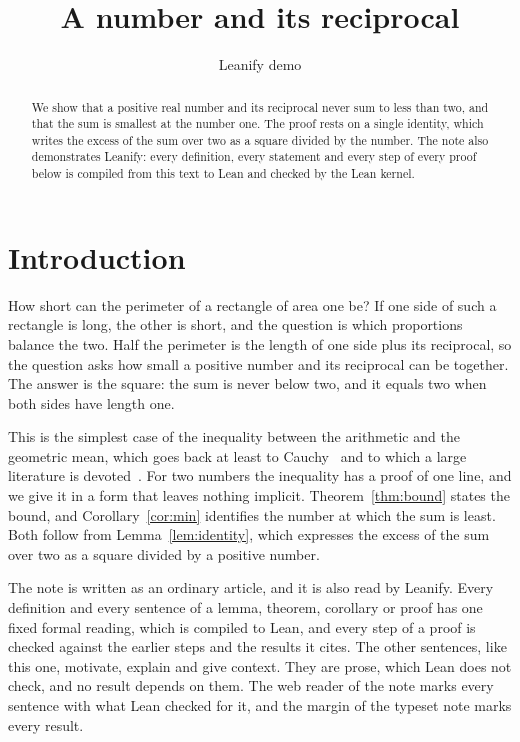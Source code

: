 \documentclass{article}
\title{A number and its reciprocal}
\author{Leanify demo}
\begin{document}
\maketitle

\begin{abstract}
We show that a positive real number and its reciprocal never sum to less than two, and that the sum is smallest at the number one.
The proof rests on a single identity, which writes the excess of the sum over two as a square divided by the number.
The note also demonstrates Leanify: every definition, every statement and every step of every proof below is compiled from this text to Lean and checked by the Lean kernel.
\end{abstract}

\section{Introduction}\label{sec:intro}

How short can the perimeter of a rectangle of area one be?
If one side of such a rectangle is long, the other is short, and the question is which proportions balance the two.
Half the perimeter is the length of one side plus its reciprocal, so the question asks how small a positive number and its reciprocal can be together.
The answer is the square: the sum is never below two, and it equals two when both sides have length one.

This is the simplest case of the inequality between the arithmetic and the geometric mean, which goes back at least to Cauchy~\cite{cauchy1821} and to which a large literature is devoted~\cite{bullen2003,hardy1952}.
For two numbers the inequality has a proof of one line, and we give it in a form that leaves nothing implicit.
Theorem~\ref{thm:bound} states the bound, and Corollary~\ref{cor:min} identifies the number at which the sum is least.
Both follow from Lemma~\ref{lem:identity}, which expresses the excess of the sum over two as a square divided by a positive number.

The note is written as an ordinary article, and it is also read by Leanify.
Every definition and every sentence of a lemma, theorem, corollary or proof has one fixed formal reading, which is compiled to Lean, and every step of a proof is checked against the earlier steps and the results it cites.
The other sentences, like this one, motivate, explain and give context.
They are prose, which Lean does not check, and no result depends on them.
The web reader of the note marks every sentence with what Lean checked for it, and the margin of the typeset note marks every result.
\end{document}
